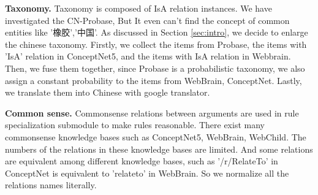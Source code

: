 \textbf{Taxonomy.} Taxonomy is composed of IsA relation instances. We have investigated the CN-Probase\cite{b1}, But It even can't find the concept of common entities like '橡胶','中国'. As discussed in Section \ref{sec:intro}, we decide to enlarge the chinese taxonomy. Firstly, we collect the items from Probase, the items with 'IsA' relation in ConceptNet5, and the items with IsA relation in Webbrain. Then, we fuse them together, since Probase is a probabilistic taxonomy, we also assign a constant probability to the items from WebBrain, ConceptNet. Lastly, we translate them into Chinese with google translator.    

\textbf{Common sense.} Commonsense relations between arguments are used in rule specialization submodule to make rules reasonable. There exist many commonsense knowledge bases such as ConceptNet5, WebBrain, WebChild.  The numbers of the relations in these knowledge bases are limited. And some relations are equivalent among different knowledge bases, such as '/r/RelateTo' in ConceptNet is equivalent to 'relateto' in WebBrain. So we normalize all the relations names literally.


 
